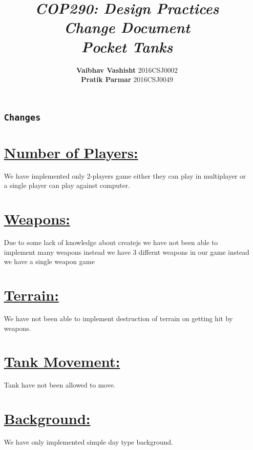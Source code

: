 \documentclass[14pt]{extarticle}
\author{\textbf{Vaibhav Vashisht} 2016CSJ0002  \\\textbf{Pratik Parmar} 2016CSJ0049}
\title{\textbf{\textit{COP290: Design Practices}\\ \textit{Change Document} \\ \textit{Pocket Tanks}  }}
\begin{document}
\maketitle
\newpage

\begin{center}

\section*{\texttt{Changes}
}
\end{center}
\section{\underline{Number of Players:}}
We have implemented only 2-players game either they can play in multiplayer or a single player can play against computer.
\section{\underline{Weapons:}}
Due to some lack of knowledge about createjs we have not been able to implement many weapons instead we have 3 differnt weapons in our game instead we have a single weapon game
\section{\underline{Terrain:}}
We have not been able to implement destruction of terrain on getting hit by weapons.
\section{\underline{Tank Movement:}}
Tank have not been allowed to move.
\section{\underline{Background:}}
We have only implemented simple day type background.
\end{document}
